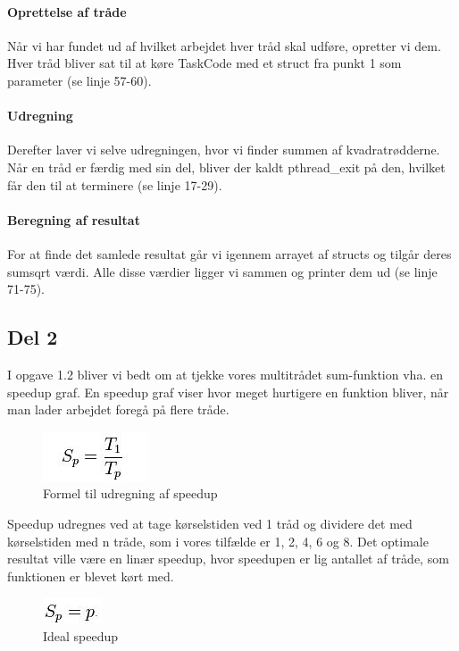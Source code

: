 \paragraph{Oprettelse af tråde} Når vi har fundet ud af hvilket arbejdet hver tråd skal udføre, opretter vi dem. Hver tråd bliver sat til at køre TaskCode med et struct fra punkt 1 som parameter (se linje 57-60).
\paragraph{Udregning} Derefter laver vi selve udregningen, hvor vi finder summen af kvadratrødderne. Når en tråd er færdig med sin del, bliver der kaldt pthread\_exit på den, hvilket får den til at terminere (se linje 17-29).
\paragraph{Beregning af resultat} For at finde det samlede resultat går vi igennem arrayet af structs og tilgår deres sumsqrt værdi. Alle disse værdier ligger vi sammen og printer dem ud (se linje 71-75).

\subsection{Del 2}
\label{O1_2}
I opgave 1.2 bliver vi bedt om at tjekke vores multitrådet sum-funktion vha. en speedup graf.
En speedup graf viser hvor meget hurtigere en funktion bliver, når man lader arbejdet foregå på flere tråde.

\begin{figure}[h!]
\centering
\includegraphics{Images/oo2-1-2-SpeedUpFormel}
\caption{Formel til udregning af speedup}
\label{SpeedFormel}
\end{figure}

Speedup udregnes ved at tage kørselstiden ved 1 tråd og dividere det med kørselstiden med n tråde, som i vores tilfælde er 1, 2, 4, 6 og 8. Det optimale resultat ville være en linær speedup, hvor speedupen er lig antallet af tråde, som funktionen er blevet kørt med.

\begin{figure}[h!]
\centering
\includegraphics{Images/oo2-1-2-IdealSpeedUp}
\caption{Ideal speedup}
\label{IdealSpeed}
\end{figure}


